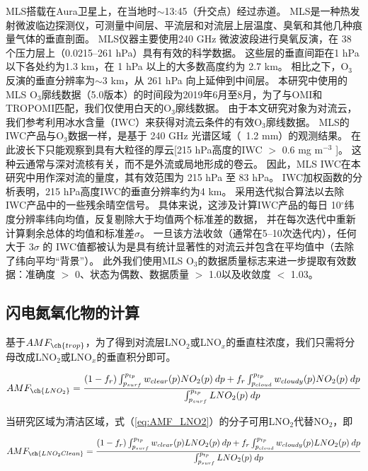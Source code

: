 MLS搭载在Aura卫星上，在当地时$\sim$13:45（升交点）经过赤道。
MLS是一种热发射微波临边探测仪，可测量中间层、平流层和对流层上层温度、臭氧和其他几种痕量气体的垂直剖面。
MLS仪器主要使用240 GHz 微波波段进行臭氧反演，在 38 个压力层上（0.0215--261 hPa）具有有效的科学数据。
这些层的垂直间距在1 hPa 以下各处约为1.3 km，在 1 hPa 以上的大多数高度约为 2.7 km。
相比之下，O$_3$反演的垂直分辨率为$\sim$3 km，从 261 hPa 向上延伸到中间层。
本研究中使用的MLS O$_3$廓线数据（5.0版本）的时间段为2019年6月至8月，为了与OMI和TROPOMI匹配，我们仅使用白天的O$_3$廓线数据。
由于本文研究对象为对流云，我们参考\citet{Livesey.2013}利用冰水含量（IWC）来获得对流云条件的有效O$_3$廓线数据。
MLS的IWC产品与O$_3$数据一样，是基于 240 GHz 光谱区域（~1.2 mm）的观测结果。
在此波长下只能观察到具有大粒径的厚云[215 hPa高度的IWC $>$ 0.6 mg m$^{-3}$ \citep{Wu.2008}]。 这种云通常与深对流核有关，而不是外流或局地形成的卷云。
因此，MLS IWC在本研究中用作深对流的量度，其有效范围为 215 hPa 至 83 hPa。
IWC加权函数的分析表明，215 hPa高度IWC的垂直分辨率约为4 km\citep{Wu.2008}。
\citet{Livesey.2013}采用迭代拟合算法以去除IWC产品中的一些残余晴空信号。
具体来说，这涉及计算IWC产品的每日 10$^{\circ}$纬度分辨率纬向均值，反复剔除大于均值两个标准差的数据，
并在每次迭代中重新计算剩余总体的均值和标准差$\sigma$。
一旦该方法收敛（通常在5--10次迭代内），任何大于 3$\sigma$ 的 IWC值都被认为是具有统计显著性的对流云并包含在平均值中（去除了纬向平均“背景”）。
此外我们使用MLS O$_3$的数据质量标志来进一步提取有效数据：准确度 $>$ 0、状态为偶数、数据质量 $>$ 1.0以及收敛度 $<$ 1.03。


\subsection{闪电氮氧化物的计算} \label{sec:amf_definition}

基于$AMF_{\ch{trop}}$，为了得到对流层LNO$_2$或LNO$_x$的垂直柱浓度，我们只需将分母改成LNO$_2$或LNO$_x$的垂直积分即可。

\begin{equation} \label{eq:AMF_LNO2}
AMF_{\ch{LNO_2}} = \frac{(1-f_r) \int_{p_{surf}}^{p_{tp}} w_{clear}(p) NO_2(p) \: dp + f_r \int_{p_{cloud}}^{p_{tp}} w_{cloudy}(p) NO_2(p) \: dp}{\int_{p_{surf}}^{p_{tp}} LNO_2(p) \: dp}
\end{equation}

当研究区域为清洁区域，式（\ref{eq:AMF_LNO2}）的分子可用LNO$_2$代替NO$_2$，即

\begin{equation} \label{eq:AMF_LNO2clean}
AMF_{\ch{LNO_2Clean}} = \frac{(1-f_r) \int_{p_{surf}}^{p_{tp}} w_{clear}(p) LNO_2(p) \: dp + f_r \int_{p_{cloud}}^{p_{tp}} w_{cloudy}(p) LNO_2(p) \: dp}{\int_{p_{surf}}^{p_{tp}} LNO_2(p) \: dp}
\end{equation}

